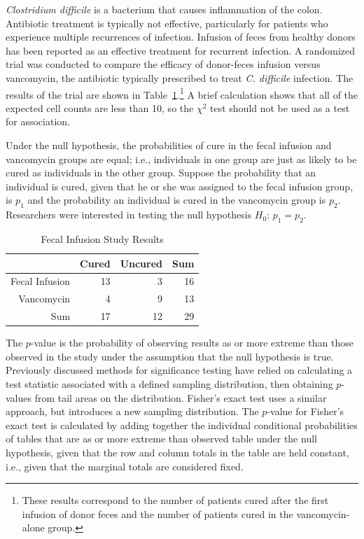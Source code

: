 \textit{Clostridium difficile} is a bacterium that causes inflammation of the colon. Antibiotic treatment is typically not effective, particularly for patients who experience multiple recurrences of infection. Infusion of feces from healthy donors has been reported as an effective treatment for recurrent infection. A randomized trial was conducted to compare the efficacy of donor-feces infusion versus vancomycin, the antibiotic typically prescribed to treat \textit{C. difficile }infection. The results of the trial are shown in Table~\ref{fecalStudyResultsTest}.\footnote{These results correspond to the number of patients cured after the first infusion of donor feces and the number of patients cured in the vancomycin-alone group.} A brief calculation shows that all of the expected cell counts are less than 10, so the $\chi^2$ test should not be used as a test for association. 

Under the null hypothesis, the probabilities of cure in the fecal infusion and vancomycin groups are equal; i.e., individuals in one group are just as likely to be cured as individuals in the other group. Suppose the probability that an individual is cured, given that he or she was assigned to the fecal infusion group, is $p_1$ and the probability an individual is cured in the vancomycin group is $p_2$. Researchers were interested in testing the null hypothesis $H_0$: $p_1 = p_2$.


\begin{table}[h]
	\centering
	\begin{tabular}{rrrr}
		\hline
		& Cured & Uncured & Sum \\ 
		\hline
		Fecal Infusion & 13 & 3 & 16 \\ 
		Vancomycin & 4 & 9 & 13 \\ 
		Sum & 17 & 12 & 29 \\ 
		\hline
	\end{tabular}
	\caption{Fecal Infusion Study Results} 
	\label{fecalStudyResultsTest}
\end{table}

The $p$-value is the probability of observing results as or more extreme than those observed in the study under  the assumption that the null hypothesis is true. Previously discussed methods for significance testing have relied on calculating a test statistic associated with a defined sampling distribution, then obtaining $p$-values from tail areas on the distribution.  Fisher's exact test uses a similar  approach, but introduces a new sampling distribution.  The $p$-value for Fisher's exact test is calculated by adding together the individual conditional probabilities of tables that are as or more extreme than observed table under the null hypothesis, given that the row and column totals in the table are held constant, i.e., given that the marginal totals are considered fixed.

